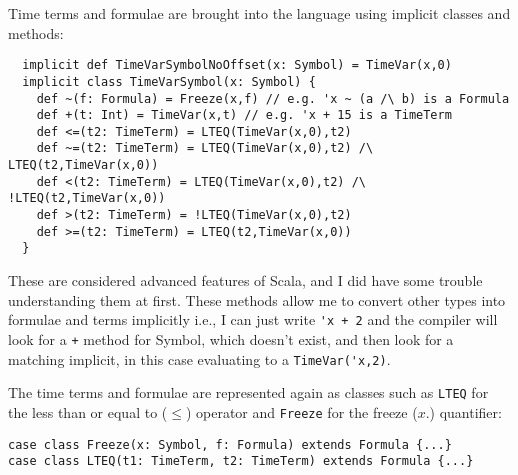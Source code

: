 \documentclass[a4paper]{article}
\begin{document}
Time terms and formulae are brought into the language using implicit classes and methods:
\begin{lstlisting}
  implicit def TimeVarSymbolNoOffset(x: Symbol) = TimeVar(x,0)
  implicit class TimeVarSymbol(x: Symbol) {
    def ~(f: Formula) = Freeze(x,f) // e.g. 'x ~ (a /\ b) is a Formula
    def +(t: Int) = TimeVar(x,t) // e.g. 'x + 15 is a TimeTerm
    def <=(t2: TimeTerm) = LTEQ(TimeVar(x,0),t2)
    def ~=(t2: TimeTerm) = LTEQ(TimeVar(x,0),t2) /\ LTEQ(t2,TimeVar(x,0))
    def <(t2: TimeTerm) = LTEQ(TimeVar(x,0),t2) /\ !LTEQ(t2,TimeVar(x,0))
    def >(t2: TimeTerm) = !LTEQ(TimeVar(x,0),t2)
    def >=(t2: TimeTerm) = LTEQ(t2,TimeVar(x,0))
  }
\end{lstlisting}
These are considered advanced features of Scala, and I did have some trouble understanding them at first. These methods allow me to convert other types into formulae and terms implicitly i.e., I can just write \lstinline{'x + 2} and the compiler will look for a \texttt{+} method for Symbol, which doesn't exist, and then look for a matching implicit, in this case evaluating to a \lstinline{TimeVar('x,2)}.

The time terms and formulae are represented again as classes such as \lstinline{LTEQ} for the less than or equal to ($\leq$) operator and \lstinline{Freeze} for the freeze ($x.$) quantifier:
\begin{lstlisting}
case class Freeze(x: Symbol, f: Formula) extends Formula {...}
case class LTEQ(t1: TimeTerm, t2: TimeTerm) extends Formula {...}
\end{lstlisting}


\end{document}
